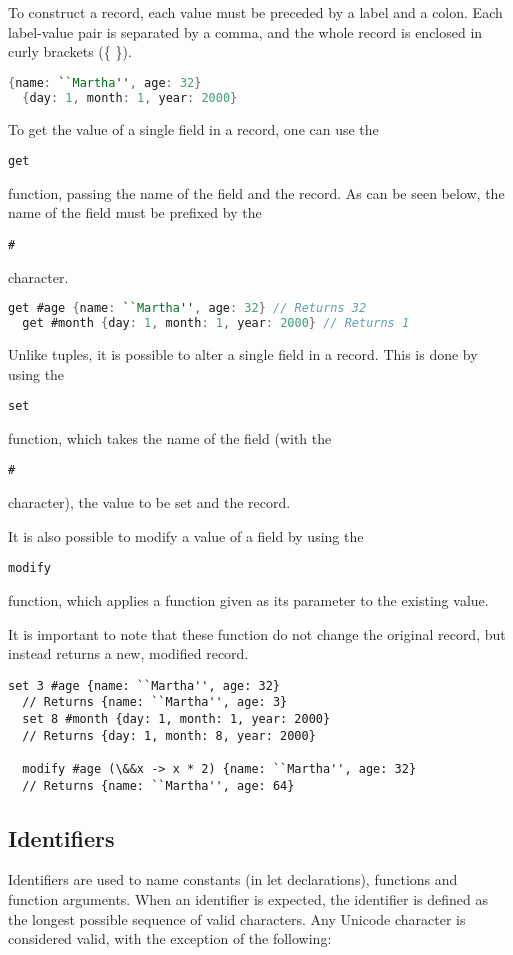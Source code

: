 \documentclass{article}
\def\code#1{\begin{footnotesize}\texttt{#1}\end{footnotesize}}
\begin{document}
To construct a record, each value must be preceded by a label and a colon.
Each label-value pair is separated by a comma, and the whole record is enclosed in curly brackets (\{ \}).

\begin{lstlisting}[language=V]
  {name: ``Martha'', age: 32}
  {day: 1, month: 1, year: 2000}
\end{lstlisting}

To get the value of a single field in a record, one can use the \code{get} function, passing the name of the field and the record.
As can be seen below, the name of the field must be prefixed by the \code{\#} character.

\begin{lstlisting}[language=V]
  get #age {name: ``Martha'', age: 32} // Returns 32
  get #month {day: 1, month: 1, year: 2000} // Returns 1
\end{lstlisting}

Unlike tuples, it is possible to alter a single field in a record.
This is done by using the \code{set} function, which takes the name of the field (with the \code{\#} character), the value to be set and the record.

It is also possible to modify a value of a field by using the \code{modify} function,  which applies a function given as its parameter to the existing value.

It is important to note that these function do not change the original record, but instead returns a new, modified record.

\begin{lstlisting}[escapechar=&]
  set 3 #age {name: ``Martha'', age: 32}
  // Returns {name: ``Martha'', age: 3}
  set 8 #month {day: 1, month: 1, year: 2000}
  // Returns {day: 1, month: 8, year: 2000}

  modify #age (\&&x -> x * 2) {name: ``Martha'', age: 32}
  // Returns {name: ``Martha'', age: 64}
\end{lstlisting}

\subsection{Identifiers}

Identifiers are used to name constants (in let declarations), functions and function arguments.
When an identifier is expected, the identifier is defined as the longest possible sequence of valid characters.
Any Unicode character is considered valid, with the exception of the following:
\end{document}
